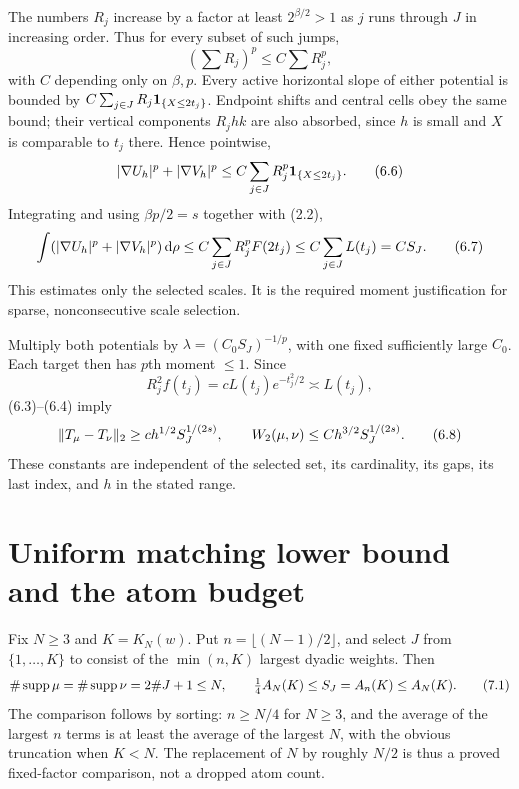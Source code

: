 The numbers $R_j$ increase by a factor at least $2^{\beta/2}>1$ as $j$ runs through $J$ in increasing order. Thus for every subset of such jumps,
\begin{equation}
 \left(\sum R_j\right)^p\le C\sum R_j^p,\tag{6.5}
\end{equation}
with $C$ depending only on $\beta,p$. Every active horizontal slope of either potential is bounded by $C\sum_{j\in J}R_j\mathbf 1_{\{X\le2t_j\}}$. Endpoint shifts and central cells obey the same bound; their vertical components $R_jhk$ are also absorbed, since $h$ is small and $X$ is comparable to $t_j$ there. Hence pointwise,
\begin{equation}
 |\nabla U_h|^p+|\nabla V_h|^p
 \le C\sum_{j\in J}R_j^p\mathbf 1_{\{X\le2t_j\}}.\tag{6.6}
\end{equation}
Integrating and using $\beta p/2=s$ together with (2.2),
\begin{equation}
 \int(|\nabla U_h|^p+|\nabla V_h|^p)\,\mathrm d\rho
 \le C\sum_{j\in J}R_j^p F(2t_j)
 \le C\sum_{j\in J}L(t_j)=CS_J.\tag{6.7}
\end{equation}
This estimates only the selected scales. It is the required moment justification for sparse, nonconsecutive scale selection.

Multiply both potentials by $\lambda=(C_0S_J)^{-1/p}$, with one fixed sufficiently large $C_0$. Each target then has $p$th moment $\le1$. Since
\[
 R_j^2f(t_j)=cL(t_j)e^{-t_j^2/2}\asymp L(t_j),
\]
(6.3)--(6.4) imply
\begin{equation}
 \lVert T_\mu-T_\nu\rVert_2\ge ch^{1/2}S_J^{1/(2s)},\qquad
 W_2(\mu,\nu)\le Ch^{3/2}S_J^{1/(2s)}.\tag{6.8}
\end{equation}
These constants are independent of the selected set, its cardinality, its gaps, its last index, and $h$ in the stated range.

\section{Uniform matching lower bound and the atom budget}
Fix $N\ge3$ and $K=K_N(w)$. Put $n=\lfloor(N-1)/2\rfloor$, and select $J$ from $\{1,\ldots,K\}$ to consist of the $\min(n,K)$ largest dyadic weights. Then
\begin{equation}
 \#\operatorname{supp}\mu=\#\operatorname{supp}\nu=2\#J+1\le N,\qquad
 \tfrac14A_N(K)\le S_J=A_n(K)\le A_N(K).\tag{7.1}
\end{equation}
The comparison follows by sorting: $n\ge N/4$ for $N\ge3$, and the average of the largest $n$ terms is at least the average of the largest $N$, with the obvious truncation when $K<N$. The replacement of $N$ by roughly $N/2$ is thus a proved fixed-factor comparison, not a dropped atom count.


